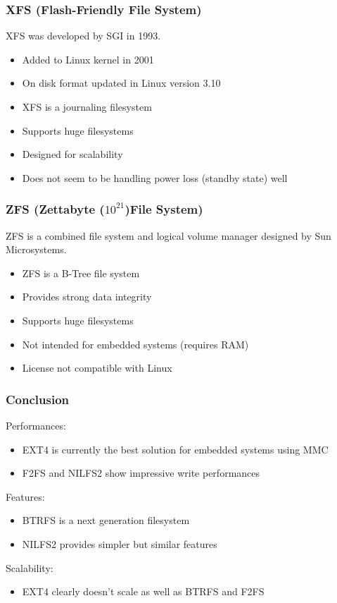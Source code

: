 \documentclass[resume]{subfiles}
\begin{document}
\subsubsection{XFS (Flash-Friendly File System)}
XFS was developed by SGI in 1993.
\begin{itemize}
    \item Added to Linux kernel in 2001
    \item On disk format updated in Linux version 3.10
    \item XFS is a journaling filesystem
    \item Supports huge filesystems
    \item Designed for scalability
    \item Does not seem to be handling power loss (standby state) well
\end{itemize}

\subsubsection{ZFS (Zettabyte ($10^{21}$)File System)}
ZFS is a combined file system and logical volume manager designed by Sun Microsystems.
\begin{itemize}
    \item ZFS is a B-Tree file system
    \item Provides strong data integrity
    \item Supports huge filesystems
    \item Not intended for embedded systems (requires RAM)
    \item License not compatible with Linux
\end{itemize}

\subsubsection{Conclusion}
Performances:
\begin{itemize}
    \item EXT4 is currently the best solution for embedded systems using MMC
    \item F2FS and NILFS2 show impressive write performances
\end{itemize}
Features:
\begin{itemize}
    \item BTRFS is a next generation filesystem
    \item NILFS2 provides simpler but similar features
\end{itemize}
Scalability:
\begin{itemize}
    \item EXT4 clearly doesn’t scale as well as BTRFS and F2FS
\end{itemize}
\end{document}
